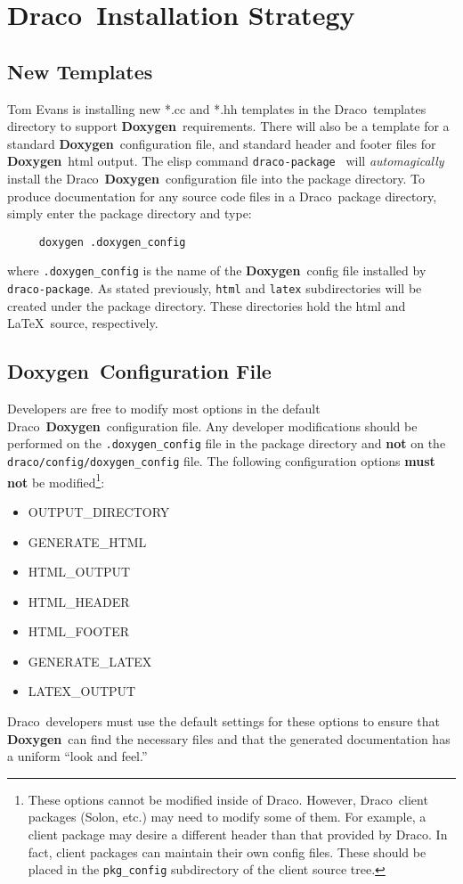 \documentclass[11pt]{nmemo}
\newcommand{\draco}{{\normalfont\sffamily Draco}}
\newcommand{\solon}{{\normalfont\sffamily Solon}}
\newcommand{\doxy}{{\normalfont\bfseries Doxygen}}
\begin{document}

\section{\draco\ Installation Strategy}
\label{sec:draco}

\subsection{New Templates}

Tom Evans is installing new *.cc and *.hh templates in the \draco\ 
templates directory to support \doxy\ requirements. There will also be
a template for a standard \doxy\ configuration file, and standard
header and footer files for \doxy\ html output.  The elisp command
\texttt{draco-package}~\cite{xtm:9909} will \textit{automagically}
install the \draco\ \doxy\ configuration file into the package
directory. To produce documentation for any source code files in a
\draco\ package directory, simply enter the package directory and
type:
\begin{verbatim}
     doxygen .doxygen_config
\end{verbatim}
where \texttt{.doxygen\_config} is the name of the \doxy\ config file
installed by \texttt{draco-package}.  As stated previously,
\texttt{html} and \texttt{latex} subdirectories will be created under
the package directory.  These directories hold the html and \LaTeX\ 
source, respectively.

\subsection{\doxy\ Configuration File}

Developers are free to modify most options in the default \draco\ 
\doxy\ configuration file.  Any developer modifications should be
performed on the \texttt{.doxygen\_config} file in the package
directory and {\bf not} on the \texttt{draco/config/doxygen\_config}
file.  The following configuration options {\bf must not} be
modified\footnote{These options cannot be modified inside of \draco.
  However, \draco\ client packages (\solon, etc.) may need to modify
  some of them.  For example, a client package may desire a different
  header than that provided by \draco.  In fact, client packages can
  maintain their own config files.  These should be placed in the
  \texttt{pkg\_config} subdirectory of the client source tree.}:
\begin{itemize}
  \ttfamily
\item OUTPUT\_DIRECTORY
\item GENERATE\_HTML
\item HTML\_OUTPUT
\item HTML\_HEADER
\item HTML\_FOOTER
\item GENERATE\_LATEX
\item LATEX\_OUTPUT
\end{itemize}
\draco\ developers must use the default settings for these options to
ensure that \doxy\ can find the necessary files and that the generated 
documentation has a uniform ``look and feel.''
\end{document}
